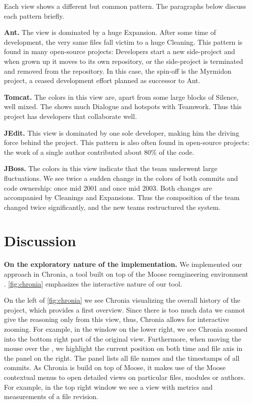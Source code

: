 Each view shows a different but common pattern. The paragraphs below discuss each pattern briefly.

\textbf{Ant.} The view is dominated by a huge Expansion. After some time of development, the very same files fall victim to a huge Cleaning. This pattern is found in many open-source projects: Developers start a new side-project and when grown up it moves to its own repository, or the side-project is terminated and removed from the repository. In this case, the spin-off is the Myrmidon project, a ceased development effort planned as successor to Ant.

\textbf{Tomcat.} The colors in this view are, apart from some large blocks of Silence, well mixed. The \omap shows much Dialogue and hotspots with Teamwork. Thus this project has developers that  collaborate well.

\textbf{JEdit.} This view is dominated by one sole developer, making him the driving force behind the project. This pattern is also often found in open-source projects: the work of a single author contributed about 80\% of the code.

\textbf{JBoss.} The colors in this view indicate that the team underwent large fluctuations. We see twice a sudden change in the colors of both commits and code ownership: once mid 2001 and once mid 2003. Both changes are accompanied by Cleanings and Expansions. Thus the composition of the team changed twice significantly, and the new teams restructured the system.

\section{Discussion}\label{sec:discussion}

\textbf{On the exploratory nature of the implementation.} We implemented our approach in Chronia, a tool built on top of the Moose reengineering environment \cite{Duca05a}. \autoref{fig:chronia} emphasizes the interactive nature of our tool.

On the left of \autoref{fig:chronia} we see Chronia visualizing the overall history of the project, which provides a first overview. Since there is too much data we cannot give the reasoning only from this view, thus, Chronia allows for interactive zooming. For example, in the window on the lower right, we see Chronia zoomed into the bottom right part of the original view. Furthermore, when moving the mouse over the \omap, we highlight the current position on both time and file axis in the panel on the right. The panel lists all file names and the timestamps of all commits. As Chronia is build on top of Moose, it makes use of the Moose contextual menus to open detailed views on particular files, modules or authors. For example, in the top right window we see a view with metrics and measurements of a file revision.

